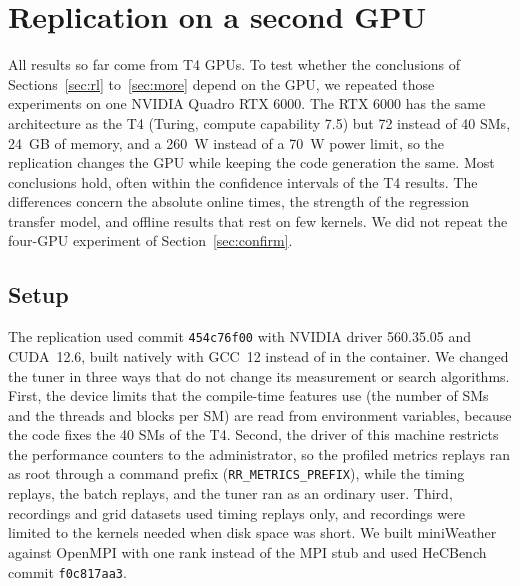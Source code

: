 \documentclass[10pt]{article}
\newcommand{\code}[1]{\texttt{#1}}
\begin{document}
\section{Replication on a second GPU}
\label{sec:replication}

All results so far come from T4 GPUs. To test whether the conclusions of
Sections~\ref{sec:rl} to~\ref{sec:more} depend on the GPU, we repeated those
experiments on one NVIDIA Quadro RTX 6000. The RTX 6000 has the same
architecture as the T4 (Turing, compute capability 7.5) but 72 instead of 40
SMs, 24~GB of memory, and a 260~W instead of a 70~W power limit, so the
replication changes the GPU while keeping the code generation the same. Most
conclusions hold, often within the confidence intervals of the T4 results. The
differences concern the absolute online times, the strength of the regression
transfer model, and offline results that rest on few kernels. We did not
repeat the four-GPU experiment of Section~\ref{sec:confirm}.

\subsection{Setup}
\label{sec:repl-setup}
The replication used commit \code{454c76f00} with NVIDIA driver 560.35.05 and
CUDA~12.6, built natively with GCC~12 instead of in the container. We changed
the tuner in three ways that do not change its measurement or search
algorithms. First, the device limits that the compile-time features use (the
number of SMs and the threads and blocks per SM) are read from environment
variables, because the code fixes the 40 SMs of the T4. Second, the driver of
this machine restricts the performance counters to the administrator, so the
profiled metrics replays ran as root through a command prefix
(\code{RR\_METRICS\_PREFIX}), while the timing replays, the batch replays, and
the tuner ran as an ordinary user. Third, recordings and grid datasets used
timing replays only, and recordings were limited to the kernels needed when
disk space was short. We built miniWeather against OpenMPI with one rank
instead of the MPI stub and used HeCBench commit \code{f0c817aa3}.
\end{document}
